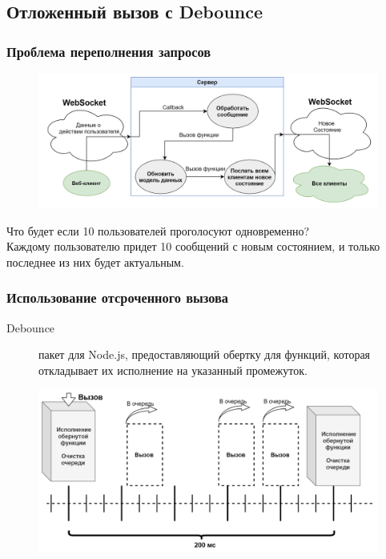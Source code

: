 \documentclass{beamer}
\begin{document}
\subsection{Отложенный вызов с Debounce}
\begin{frame}
\frametitle{Проблема переполнения запросов}
\begin{figure}
	\includegraphics[width=\linewidth]{img/nodeb.png}
\end{figure}
	Что будет если 10 пользователей проголосуют одновременно?\\
	Каждому пользователю придет 10 сообщений с новым состоянием, и только последнее из них будет актуальным.  
\end{frame}

\begin{frame}
\frametitle{Использование отсроченного вызова}
\begin{description}
	\item[Debounce] пакет для Node.js, предоставляющий обертку для функций, которая откладывает их исполнение на указанный промежуток.
\end{description} 
	 \begin{figure}
	 	\includegraphics[width=\linewidth]{img/debounce.png}
	 \end{figure}
\end{frame}
\end{document}
